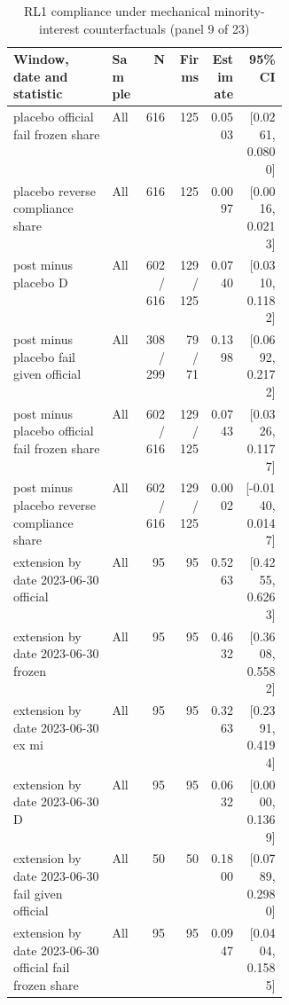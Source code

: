 \begin{table}[!htbp]\centering\scriptsize
\caption{RL1 compliance under mechanical minority-interest counterfactuals (panel 9 of 23)}
\begin{threeparttable}
\begin{tabular}{p{0.36\linewidth}lrrrr}
\toprule
Window, date and statistic & Sample & N & Firms & Estimate & 95\% CI \\
\midrule
placebo  official fail frozen share & All & 616 & 125 & 0.0503 & [0.0261, 0.0800] \\
placebo  reverse compliance share & All & 616 & 125 & 0.0097 & [0.0016, 0.0213] \\
post minus placebo  D & All & 602 / 616 & 129 / 125 & 0.0740 & [0.0310, 0.1182] \\
post minus placebo  fail given official & All & 308 / 299 & 79 / 71 & 0.1398 & [0.0692, 0.2172] \\
post minus placebo  official fail frozen share & All & 602 / 616 & 129 / 125 & 0.0743 & [0.0326, 0.1177] \\
post minus placebo  reverse compliance share & All & 602 / 616 & 129 / 125 & 0.0002 & [-0.0140, 0.0147] \\
extension by date 2023-06-30 official & All & 95 & 95 & 0.5263 & [0.4255, 0.6263] \\
extension by date 2023-06-30 frozen & All & 95 & 95 & 0.4632 & [0.3608, 0.5582] \\
extension by date 2023-06-30 ex mi & All & 95 & 95 & 0.3263 & [0.2391, 0.4194] \\
extension by date 2023-06-30 D & All & 95 & 95 & 0.0632 & [0.0000, 0.1369] \\
extension by date 2023-06-30 fail given official & All & 50 & 50 & 0.1800 & [0.0789, 0.2980] \\
extension by date 2023-06-30 official fail frozen share & All & 95 & 95 & 0.0947 & [0.0404, 0.1585] \\
\bottomrule
\end{tabular}
\begin{tablenotes}[flushleft]\footnotesize

\end{tablenotes}
\end{threeparttable}
\end{table}
